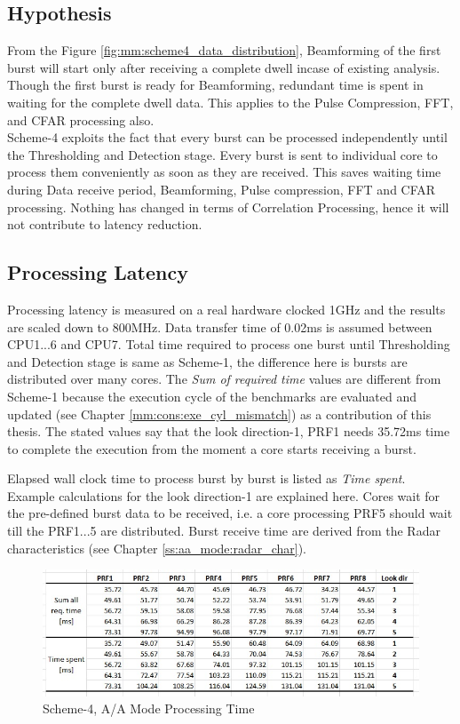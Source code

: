 \subsection{Hypothesis}
From the Figure \ref{fig:mm:scheme4_data_distribution}, Beamforming of the first burst will start only after receiving a complete dwell incase of existing analysis. Though the first burst is ready for Beamforming, redundant time is spent in waiting for the complete dwell data. This applies to the Pulse Compression, FFT, and CFAR processing also.\\[0.2cm]
Scheme-4 exploits the fact that every burst can be processed independently until the Thresholding and Detection stage. Every burst is sent to individual core to process them conveniently as soon as they are received. This saves waiting time during Data receive period, Beamforming, Pulse compression, FFT and CFAR processing. Nothing has changed in terms of Correlation Processing, hence it will not contribute to latency reduction.


\subsection{Processing Latency}
\label{ss:mm:scheme4:latency}
Processing latency is measured on a real hardware clocked 1GHz and the results are scaled down to 800MHz. Data transfer time of 0.02ms is assumed between CPU1...6 and CPU7. Total time required to process one burst until Thresholding and Detection stage is same as Scheme-1, the difference here is bursts are distributed over many cores. The \textsl{Sum of required time} values are different from Scheme-1 because the execution cycle of the benchmarks are evaluated and updated (see Chapter \ref{mm:cons:exe_cyl_mismatch}) as a contribution of this thesis. The stated values say that the look direction-1, PRF1 needs 35.72ms time to complete the execution from the moment a core starts receiving a burst. 

Elapsed wall clock time to process burst by burst is listed as \textsl{Time spent}. Example calculations for the look direction-1 are explained here. Cores wait for the pre-defined burst data to be received, i.e. a core processing PRF5 should wait till the PRF1...5 are distributed. Burst receive time are derived from the Radar characteristics (see Chapter \ref{ss:aa_mode:radar_char}).

\begin{figure}[h!]
	\centering
	\includegraphics[width=140mm]{figures/scheme4_elapsed_time}
	\caption{Scheme-4, A/A Mode Processing Time}
	\label{fig:mm:scheme4_elapsed_time}
\end{figure}

